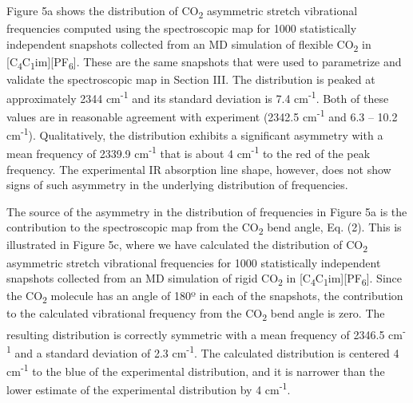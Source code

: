 \documentclass[]{article}
\begin{document}
Figure 5a shows the distribution of CO\textsubscript{2} asymmetric
stretch vibrational frequencies computed using the spectroscopic map for
1000 statistically independent snapshots collected from an MD simulation
of flexible CO\textsubscript{2} in
{[}C\textsubscript{4}C\textsubscript{1}im{]}{[}PF\textsubscript{6}{]}.
These are the same snapshots that were used to parametrize and validate
the spectroscopic map in Section III. The distribution is peaked at
approximately 2344 cm\textsuperscript{-1} and its standard deviation is
7.4 cm\textsuperscript{-1}. Both of these values are in reasonable
agreement with experiment (2342.5 cm\textsuperscript{-1} and 6.3 -- 10.2
cm\textsuperscript{-1}). Qualitatively, the distribution exhibits a
significant asymmetry with a mean frequency of 2339.9
cm\textsuperscript{-1} that is about 4 cm\textsuperscript{-1} to the red
of the peak frequency. The experimental IR absorption line shape,
however, does not show signs of such asymmetry in the underlying
distribution of frequencies.

The source of the asymmetry in the distribution of frequencies in Figure
5a is the contribution to the spectroscopic map from the
CO\textsubscript{2} bend angle, Eq. (2). This is illustrated in Figure
5c, where we have calculated the distribution of CO\textsubscript{2}
asymmetric stretch vibrational frequencies for 1000 statistically
independent snapshots collected from an MD simulation of rigid
CO\textsubscript{2} in
{[}C\textsubscript{4}C\textsubscript{1}im{]}{[}PF\textsubscript{6}{]}.
Since the CO\textsubscript{2} molecule has an angle of 180º in each of
the snapshots, the contribution to the calculated vibrational frequency
from the CO\textsubscript{2} bend angle is zero. The resulting
distribution is correctly symmetric with a mean frequency of 2346.5
cm\textsuperscript{-1} and a standard deviation of 2.3
cm\textsuperscript{-1}. The calculated distribution is centered 4
cm\textsuperscript{-1} to the blue of the experimental distribution, and
it is narrower than the lower estimate of the experimental distribution
by 4 cm\textsuperscript{-1}.
\end{document}
